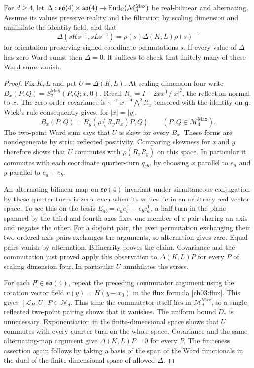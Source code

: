 \begin{theorem}\label{ch03:internal-tests}
For $d\ge4$, let
$\Delta:\mathfrak{so}(4)\times\mathfrak{so}(4)
\to\operatorname{End}_{\mathbb C}(\mathcal M_d^{\mathrm{Max}})$
be real-bilinear and alternating. Assume its values preserve reality and
the filtration by scaling dimension and annihilate the identity field, and that
\[
 \Delta(sKs^{-1},sLs^{-1})=\rho(s)\Delta(K,L)\rho(s)^{-1}
\]
for orientation-preserving signed coordinate permutations $s$.
If every value of $\Delta$ has zero Ward sums, then $\Delta=0$.
It suffices to check that finitely many of these Ward sums vanish.
\end{theorem}

\begin{proof}
Fix $K,L$ and put $U=\Delta(K,L)$. At scaling dimension four write
$B_x(P,Q)=S_2^{\mathrm{Max}}(P,Q;x,0)$.
Recall $R_x=I-2xx^{\mathsf T}/|x|^2$, the reflection normal to $x$.
The zero-order covariance is
$\pi^{-2}|x|^{-4}\bigwedge^2R_x$ tensored with the identity on $\mathfrak g$.
Wick's rule consequently gives, for $|x|=|y|$,
\[
 B_x(P,Q)=B_y(\rho(R_yR_x)P,Q)
 \qquad(P,Q\in\mathcal M_4^{\mathrm{Max}}).
\]
The two-point Ward sum says that $U$ is skew for every $B_x$.
These forms are nondegenerate by strict reflected positivity.
Comparing skewness for $x$ and $y$ therefore shows that $U$ commutes
with $\rho(R_xR_y)$ on this space. In particular it commutes with each
coordinate quarter-turn $q_{ab}$, by choosing $x$ parallel to $e_a$
and $y$ parallel to $e_a+e_b$.

An alternating bilinear map on $\mathfrak{so}(4)$ invariant under
simultaneous conjugation by these quarter-turns is zero, even when its
values lie in an arbitrary real vector space. To see this on the basis
$E_{ab}=e_ae_b^{\mathsf T}-e_be_a^{\mathsf T}$, a half-turn in the
plane spanned by the third and fourth axes fixes one member of a pair
sharing an axis and negates the other. For a disjoint pair, the even
permutation exchanging their two ordered axis pairs exchanges the
arguments, so alternation gives zero. Equal pairs vanish by alternation.
Bilinearity proves the claim. Covariance and the commutation just proved
apply this observation to $\Delta(K,L)P$ for every $P$ of scaling dimension four.
In particular $U$ annihilates the stress.

For each $H\in\mathfrak{so}(4)$, repeat the preceding commutator
argument using the rotation vector field $v(y)=H(y-x_0)$ in the flux
formula \eqref{ch03:flux}. This gives $[\mathcal L_H,U]P\in\mathcal N_d$.
This time the commutator itself lies in $\mathcal M_d^{\mathrm{Max}}$,
so a single reflected two-point pairing shows that it vanishes. The uniform
bound $D_*$ is unnecessary. Exponentiation in the finite-dimensional
space shows that $U$ commutes with every quarter-turn on the whole
space. Covariance and the same alternating-map argument give
$\Delta(K,L)P=0$ for every $P$. The finiteness assertion again follows
by taking a basis of the span of the Ward functionals in the dual of
the finite-dimensional space of allowed $\Delta$.
\end{proof}

